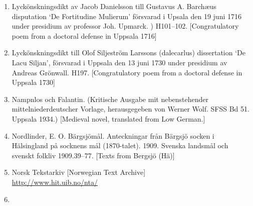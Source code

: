 \begin{enumerate}

\item[\sqbrSenum]

\label{bkm:Ref154213694}Lyckönskningsdikt av Jacob Danielsson till Gustavus A. Barchæus disputation ‘De Fortitudine Mulierum’ försvarad i Upsala den 19 juni 1716 under presidium av professor Joh. Upmarck. ) H101--102. [Congratulatory poem from a doctoral defense in Uppsala 1716]

\item[\sqbrSenum]

\label{bkm:Ref160604331}Lyckönskningsdikt till Olof Siljeström Larssons (dalecarlus) dissertation ‘De Lacu Siljan’, försvarad i Uppsala den 13 juni 1730 under presidium av Andreas Grönwall. H197. [Congratulatory poem from a doctoral defense in Uppsala 1730]


\item[\sqbrSenum]

\label{bkm:Ref155341402}Nampnlos och Falantin. (Kritische Ausgabe mit nebenstehender mittelniederdeutscher Vorlage, herausgegeben von Werner Wolf. SFSS Bd 51. Uppsala 1934.) [Medieval novel, translated from Low German.]

\item[\sqbrSenum]

\label{bkm:Ref154203595}Nordlinder, E. O. Bärgsjömål. Anteckningar från Bärgsjö socken i Hälsingland på socknens mål (1870-talet). 1909. Svenska landsmål och svenskt folkliv 1909.39--77. [Texts from Bergsjö (Hä)]


\item[\sqbrSenum]

\label{bkm:Ref137882336}Norsk Tekstarkiv [Norwegian Text Archive]\\
\url{http://www.hit.uib.no/nta/}

\item[\sqbrSenum]


\end{enumerate}
